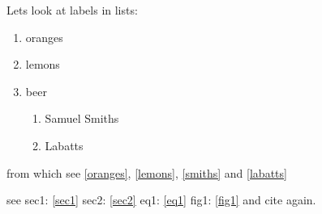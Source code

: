 \documentclass[11pt]{book}
\begin{document}
Lets look at labels in lists:
\begin{enumerate}
\item oranges\label{oranges}
\item lemons\label{lemons}
\item beer\label{beer}
  \begin{enumerate}
  \item Samuel Smiths\label{smiths}
  \item Labatts\label{labatts}
  \end{enumerate}
\end{enumerate}
\clearpage

from which see \autoref{oranges}, \ref{lemons}, \ref{smiths} and
\autoref{labatts}


see
sec1: \autoref{sec1}
sec2: \autoref{sec2}
eq1: \autoref{eq1}
fig1: \autoref{fig1}
and cite \cite{Barcelo:1992:caa} again.
\onecolumn
\end{document}
